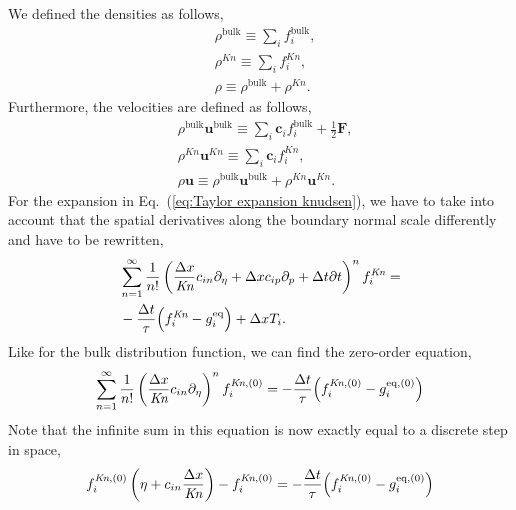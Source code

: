 \documentclass[aps,physrev,twocolumn,10pt]{revtex4-2}
\begin{document}
We defined the densities as follows,
\begin{equation}
\begin{split}
    &\rho^\text{bulk} \equiv \sum_i f_i^\text{bulk},\\
    &\rho^\textit{Kn} \equiv \sum_i f_i^\textit{Kn},\\
    &\rho \equiv \rho^\text{bulk} + \rho^\textit{Kn}.
\end{split}
\end{equation}
Furthermore, the velocities are defined as follows,
\begin{equation}
\begin{split}
    &\rho^\text{bulk}\bm{u}^\text{bulk} \equiv \sum_i \bm{c}_if_i^\text{bulk} + \frac{1}{2}\bm{F},\\
    &\rho^\textit{Kn}\bm{u}^\textit{Kn} \equiv \sum_i \bm{c}_if_i^\textit{Kn},\\
    &\rho\bm{u} \equiv \rho^\text{bulk}\bm{u}^\text{bulk} + \rho^\textit{Kn}\bm{u}^\textit{Kn}.
\end{split}
\end{equation}
For the expansion in Eq.~(\ref{eq:Taylor expansion knudsen}), we have to take into account that the spatial derivatives along the boundary normal scale differently and have to be rewritten,
\begin{equation}
\begin{split}
    &\sum_{n=1}^\infty \frac{1}{n!}\left(\frac{\Delta x}{\textit{Kn}} c_{in}\partial_\eta + \Delta x c_{ip} \partial_p + \Delta t \partial t\right)^n f_i^\textit{Kn} = \\
    &-\frac{\Delta t}{\tau}\Bigl(f_i^\textit{Kn}  - g_i^\text{eq}\Bigr) + \Delta x T_i.
\end{split}
\end{equation}
Like for the bulk distribution function, we can find the zero-order equation,
\begin{equation}
\begin{split}
    \sum_{n=1}^\infty \frac{1}{n!}\left(\frac{\Delta x}{\textit{Kn}} c_{in}\partial_\eta\right)^n f_i^{\textit{Kn},(0)}= -\frac{\Delta t}{\tau}\Bigl(f_i^{\textit{Kn},(0)}  - g_i^{\text{eq},(0)}\Bigr)
\end{split}
\end{equation}
Note that the infinite sum in this equation is now exactly equal to a discrete step in space,
\begin{equation}
    f_i^{\textit{Kn},(0)}\left(\eta + c_{in}\frac{\Delta x}{\textit{Kn}}\right) - f_i^{\textit{Kn},(0)} =-\frac{\Delta t}{\tau}\Bigl(f_i^{\textit{Kn},(0)}  - g_i^{\text{eq},(0)}\Bigr)
\end{equation}
\end{document}
